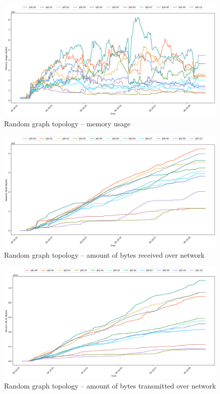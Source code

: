 \begin{figure}[H]
\includegraphics[width=\linewidth]{figures/graph-random/mem_usage.png}
\caption{Random graph topology -- memory usage}
\end{figure}
\begin{figure}[H]
\includegraphics[width=\linewidth]{figures/graph-random/net_read.png}
\caption{Random graph topology -- amount of bytes received over network}
\end{figure}
\begin{figure}[H]
\includegraphics[width=\linewidth]{figures/graph-random/net_write.png}
\caption{Random graph topology -- amount of bytes transmitted over network}
\end{figure}


